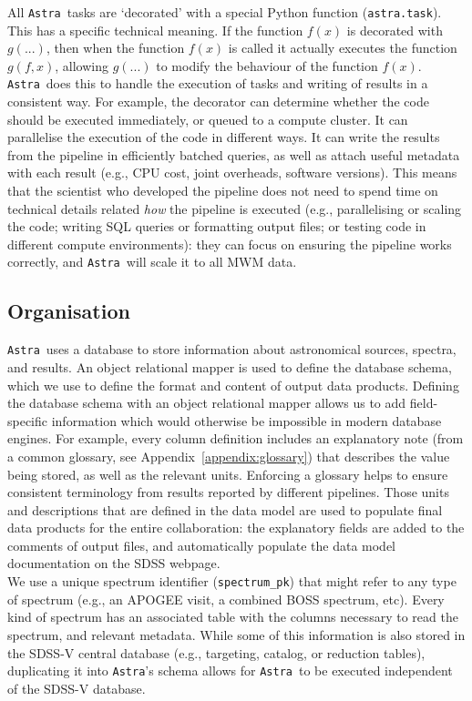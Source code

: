 \documentclass[modern]{aastex631}
\newcommand{\astra}{\texttt{Astra}}
\newcommand{\Astra}{\astra}
\begin{document}
All \Astra\ tasks are `decorated' with a special Python function (\texttt{astra.task}). This has a specific technical meaning. If the function $f(x)$ is decorated with $g(...)$, then when the function $f(x)$ is called it actually executes the function $g(f, x)$, allowing $g(...)$ to modify the behaviour of the function $f(x)$.
\Astra\ does this to handle the execution of tasks and writing of results in a consistent way.
For example, the decorator can determine whether the code should be executed immediately, or queued to a compute cluster. It can parallelise the execution of the code in different ways. It can write the results from the pipeline in efficiently batched queries, as well as attach useful metadata with each result (e.g., CPU cost, joint overheads, software versions). This means that the scientist who developed the pipeline does not need to spend time on technical details related \emph{how} the pipeline is executed (e.g., parallelising or scaling the code; writing SQL queries or formatting output files; or testing code in different compute environments): they can focus on ensuring the pipeline works correctly, and \Astra\ will scale it to all MWM data.\\

\subsection{Organisation} \label{ref:data-models}

\Astra\ uses a database to store information about astronomical sources, spectra, and results.
An object relational mapper \citep{} is used to define the database schema, which we use to define the format and content of output data products.
Defining the database schema with an object relational mapper allows us to add field-specific information which would otherwise be impossible in modern database engines.
For example, every column definition includes an explanatory note (from a common glossary, see Appendix~\ref{appendix:glossary}) that describes the value being stored, as well as the relevant units. Enforcing a glossary helps to ensure consistent terminology from results reported by different pipelines. 
Those units and descriptions that are defined in the data model are used to populate final data products for the entire collaboration: the explanatory fields are added to the comments of output files, and automatically populate the data model documentation on the SDSS webpage. \\

We use a unique spectrum identifier (\texttt{spectrum\_pk}) that might refer to any type of spectrum (e.g., an APOGEE visit, a combined BOSS spectrum, etc). Every kind of spectrum has an associated table with the columns necessary to read the spectrum, and relevant metadata.
While some of this information is also stored in the SDSS-V central database (e.g., targeting, catalog, or reduction tables),
duplicating it into \Astra's schema allows for \Astra\ to be executed independent of the SDSS-V database.\\
\end{document}

